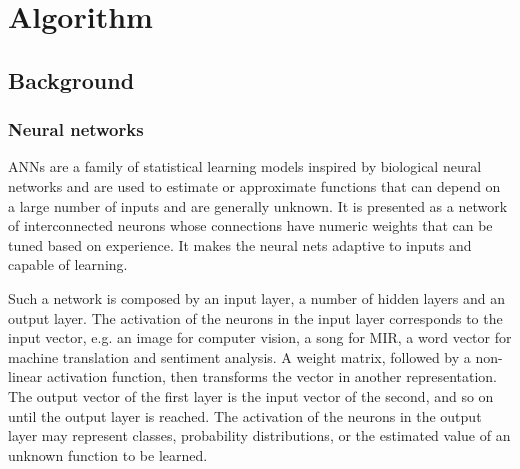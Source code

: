 \part{Algorithm} \label{part:algorithm}

\chapter{Background} \label{chap:background}


\section{Neural networks}

\gls{ANNs} are a family of statistical learning models inspired by biological neural networks and are used to estimate or approximate functions that can depend on a large number of inputs and are generally unknown. It is presented as a network of interconnected neurons whose connections have numeric weights that can be tuned based on experience. It makes the neural nets adaptive to inputs and capable of learning.

Such a network is composed by an input layer, a number of hidden layers and an output layer. The activation of the neurons in the input layer corresponds to the input vector, e.g. an image for computer vision, a song for \gls{MIR}, a word vector for machine translation and sentiment analysis. A weight matrix, followed by a non-linear activation function, then transforms the vector in another representation. The output vector of the first layer is the input vector of the second, and so on until the output layer is reached. The activation of the neurons in the output layer may represent classes, probability distributions, or the estimated value of an unknown function to be learned.

